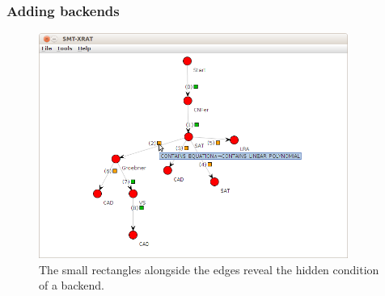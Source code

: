 \subsubsection{Adding backends}
\label{sec:adding_backends}
\begin{figure}
  \begin{center}
    \includegraphics[width=0.9\textwidth]{graphics/smt-xrat_condition_ttt.png}
  \end{center}
  \caption{The small rectangles alongside the edges reveal the hidden condition of a backend.}
  \label{fig:smt-xrat_condition_ttt}
\end{figure}


